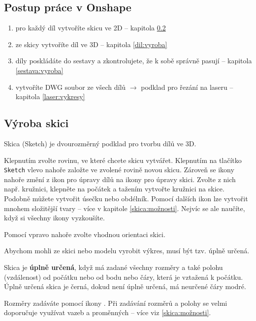 \subsection{Postup práce v Onshape}
 
\begin{enumerate}
	\item pro každý díl vytvoříte skicu ve 2D -- kapitola \ref{skica:vyroba}
	
	\item ze skicy vytvoříte díl ve 3D -- kapitola \ref{dil:vyroba}
	
	\item díly poskládáte do sestavy a zkontrolujete, že k sobě správně pasují -- kapitola \ref{sestava:vyroba}
	
	\item vytvoříte DWG soubor ze všech dílů $\rightarrow$ podklad pro řezání na laseru -- kapitola \ref{laser:vykresy}	
\end{enumerate}



\subsection{Výroba skici} \label{skica:vyroba}


Skica (Sketch)  je dvourozměrný podklad pro tvorbu dílů ve 3D. 

Klepnutím zvolte rovinu, ve které chcete skicu vytvářet. Klepnutím na tlačítko {\tt Sketch} vlevo nahoře založte ve zvolené rovině novou skicu. 
Zároveň se ikony nahoře změní z ikon pro úpravy dílů na ikony pro úpravy skici. 
Zvolte z nich např. kružnici, klepněte na počátek a tažením vytvořte kružnici na skice. 
Podobně můžete vytvořit úsečku nebo obdélník. 
Pomocí dalších ikon lze vytvořit mnohem složitější tvary -- více v kapitole \ref{skica:možnosti}.
Nejvíc se ale naučíte, když si všechny ikony vyzkoušíte. 

Pomocí  vpravo nahoře zvolte vhodnou orientaci skici. 

Abychom mohli ze skici nebo modelu vyrobit výkres, musí být tzv. úplně určená.

Skica je \textbf{úplně určená}, když má zadané všechny rozměry a také polohu (vzdálenost) od počátku nebo od bodu nebo čáry, která je vztažená k počátku.
Úplně určená skica je černá, dokud není úplně určená, má neurčené čáry modré.  

Rozměry zadáváte pomocí ikony .
Při zadávání rozměrů a polohy se velmi doporučuje využívat vazeb a proměnných -- více viz  \ref{skica:možnosti}.


